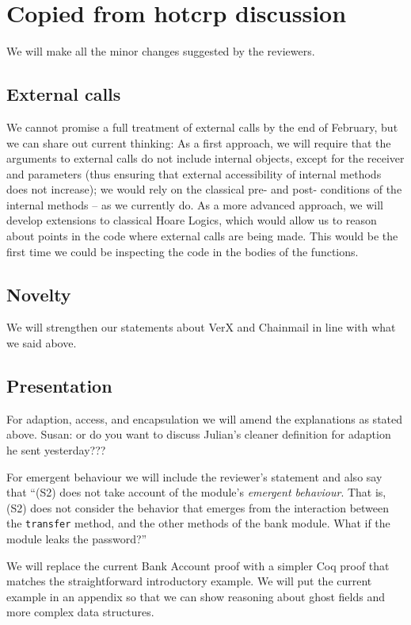 \documentclass[11pt]{amsart}
\begin{document}
\section{Copied from hotcrp discussion}


 
 
  We will make all the minor changes suggested by the reviewers.
 \subsection*{External calls}
 We cannot promise a full treatment of external calls by the end of February, but we can share out current thinking:  As a first approach, we will require that the arguments to external calls do not include internal objects, except for the receiver and parameters (thus ensuring that external accessibility of internal methods does not increase); we would rely on the classical pre- and post- conditions of the internal methods -- as we currently do. As a more advanced approach, we will develop extensions to classical Hoare Logics, which would allow us to reason about points in the code where external calls are being made. This would be the first time we could be inspecting the code in the bodies of the functions.
 \subsection*{Novelty}
 We will strengthen our statements about VerX and Chainmail in line with what we said above.
 
 \subsection*{Presentation}
 
 For adaption, access, and encapsulation we will amend the explanations as stated above. Susan: or do you want to discuss Julian's cleaner definition for adaption he sent yesterday???
 
 For emergent behaviour we will include the reviewer's statement and also say that ``(S2) does not take account of the module's \emph{emergent behaviour}. That is, (S2) does not consider the behavior that emerges from the interaction between the 
\texttt{transfer} method, and the other methods of the bank module. What if the module leaks the password?''
 
 We will replace the current Bank Account proof with a simpler Coq proof that matches the straightforward introductory example. We will put the current example in an appendix so that we can 
show reasoning about ghost fields and more complex data structures. 
\end{document}

